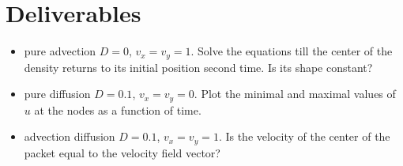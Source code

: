 \documentclass[7pt]{article}
\begin{document}
\section{Deliverables}
\begin{itemize}
\item pure advection $D=0$, $v_x=v_y=1$. Solve the equations till the center of the density returns to its initial position second time. Is its shape constant?
\item pure diffusion $D=0.1$, $v_x=v_y=0$.  Plot the minimal and maximal values of $u$ at the nodes as a function of time.
\item advection diffusion $D=0.1$, $v_x=v_y=1$. Is the velocity of the center of the packet equal to the velocity field vector?
\end{itemize}
\end{document}
